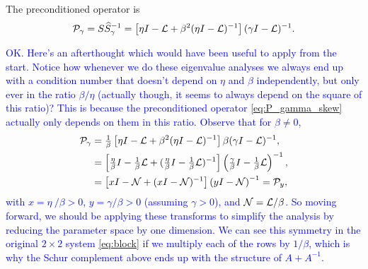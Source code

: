 \documentclass[a4paper,10pt]{article}
\newcommand{\tcb}{\textcolor{blue}}
\begin{document}
{The preconditioned operator is
\begin{align}
\label{eq:P_gamma_skew}
{\cal P}_{\gamma} 
= 
S \widehat{S}_{\gamma}^{-1} 
= 
\left[ \eta I - {\cal L} +  \beta^2 (\eta I - {\cal L})^{-1} \right] (\gamma I - {\cal L})^{-1}.
\end{align} 

\tcb{OK. Here's an afterthought which would have been useful to apply from the start. Notice how whenever we do these eigenvalue analyses we always end up with a condition number that doesn't depend on $\eta$ and $\beta$ independently, but only ever in the ratio $\beta/\eta$ (actually though, it seems to always depend on the square of this ratio)? This is because the preconditioned operator \eqref{eq:P_gamma_skew} actually only depends on them in this ratio. Observe that for $\beta \neq 0$,
\begin{align*}
{\cal P}_{\gamma} 
&= 
\tfrac{1}{\beta} \left[ \eta I - {\cal L} +  \beta^2 (\eta I - {\cal L})^{-1} \right] \beta (\gamma I - {\cal L})^{-1}, 
\\
&=
\left[ \tfrac{\eta}{\beta} I - \tfrac{1}{\beta} {\cal L} + (\tfrac{\eta}{\beta} I - \tfrac{1}{\beta} {\cal L})^{-1} \right] \left(\tfrac{\gamma}{\beta} I - \tfrac{1}{\beta} {\cal L} \right)^{-1},
\\
&=
\left[ x I - {\cal N} + (x I -  {\cal N})^{-1} \right] \left(y I - {\cal N} \right)^{-1} = {\cal P}_y,
\end{align*}
with $x = \eta \ /\beta > 0$, $y = \gamma / \beta > 0$ (assuming $\gamma > 0$), and ${\cal N} = {\cal L}/\beta$. So moving forward, we should be applying these transforms to simplify the analysis by reducing the parameter space by one dimension. We can see this symmetry in the original $2 \times 2$ system \eqref{eq:block} if we multiply each of the rows by $1/\beta$, which is why the Schur complement above ends up with the structure of $A + A^{-1}$.}

}
\end{document}
